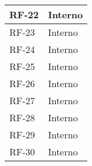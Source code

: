 \begin{longtable}{|>{\centering\arraybackslash}m{}|>{\centering\arraybackslash}m{}|}
	RF-22              & Interno                                                                                                                                                                                                                                              \\\hline
	RF-23              & Interno                                                                                                                                                                                                                                              \\\hline
	RF-24              & Interno                                                                                                                                                                                                                                              \\\hline
	RF-25              & Interno                                                                                                                                                                                                                                              \\\hline
	RF-26              & Interno                                                                                                                                                                                                                                              \\\hline
	RF-27              & Interno                                                                                                                                                                                                                                              \\\hline
	RF-28              & Interno                                                                                                                                                                                                                                              \\\hline
	RF-29              & Interno                                                                                                                                                                                                                                              \\\hline
	RF-30              & Interno                                                                                                                                                                                                                                              \\\hline

\end{longtable}
